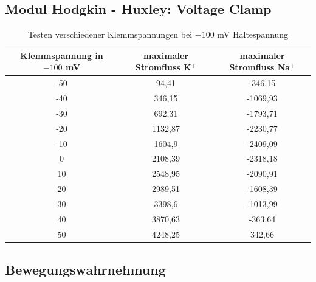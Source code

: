 \documentclass[11pt]{article}
\begin{document}
\subsection{Modul Hodgkin - Huxley: Voltage Clamp}


\begin{table}[H]
\caption{Testen verschiedener Klemmspannungen bei $-100$ mV Haltespannung}
\centering
\begin{adjustbox}{width=1.3\textwidth, center=\textwidth}
\begin{tabular}{c|c|c}
Klemmspannung in $-100$ mV & maximaler Stromfluss K$^+$ & maximaler Stromfluss Na$^+$\\
\hline\hline
-50	&	94,41	&	-346,15	\\
-40	&	346,15	&	-1069,93	\\
-30	&	692,31	&	-1793,71	\\
-20	&	1132,87	&	-2230,77	\\
-10	&	1604,9	&	-2409,09	\\
0	&	2108,39	&	-2318,18	\\
10	&	2548,95	&	-2090,91	\\
20	&	2989,51	&	-1608,39	\\
30	&	3398,6	&	-1013,99	\\
40	&	3870,63	&	-363,64	\\
50	&	4248,25	&	342,66	
\end{tabular}
\end{adjustbox}
\label{werte}
\end{table}


\subsection{Bewegungswahrnehmung}
\end{document}
